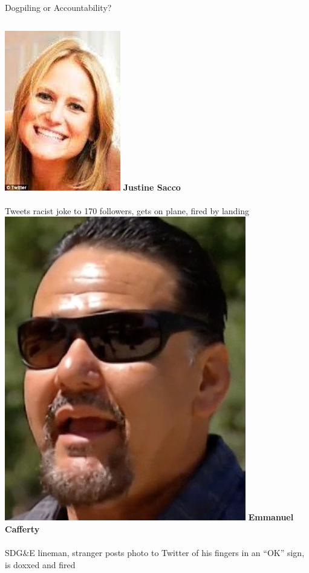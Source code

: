 \documentclass[nobackground,dvipsnames,table,aspectratio=169]{beamer}
\begin{document}
\begin{frame}{Dogpiling or Accountability?}
    \begin{columns}[T]
            \includegraphics[trim=0 0 0 0, clip, height=0.3\textheight]{justine-sacco}
            \textbf{Justine Sacco}\\~\\
            Tweets racist joke to 170 followers, gets on plane, fired by landing
            \includegraphics[height=0.3\textheight]{emmanuel-cafferty}
            \textbf{Emmanuel Cafferty}\\~\\
            SDG\&E lineman, stranger posts photo to Twitter of his fingers in an “OK” sign, is doxxed and fired

\end{columns}
\end{frame}
\end{document}
